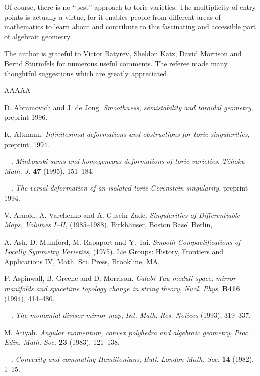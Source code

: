 \documentclass{amsart}
\theoremstyle{plain}
\theoremstyle{definition}
\begin{document}
	Of course, there is no ``best'' approach to toric varieties.
The multiplicity of entry points is actually a virtue, for it enables
people from different areas of mathematics to learn about and
contribute to this fascinating and accessible part of algebraic
geometry.

	The author is grateful to Victor Batyrev, Sheldon Katz, David
Morrison and Bernd Sturmfels for numerous useful comments.  The
referee made many thoughtful suggestions which are greatly
appreciated.

\begin{thebibliography}{AAAAA}


D. Abramovich and J. de Jong. \textit{Smoothness, semistability and toroidal geometry}, pre\-print 1996.

K. Altmann. \textit{Infinitesimal deformations and obstructions for toric singularities}, pre\-print, 1994.

---. \textit{Minkowski sums and homogeneous deformations of toric varieties}, \textit{T\^ ohoku Math. J.} \textbf{47} (1995), 151--184.

---. \textit{The versal deformation of an isolated toric Gorenstein singularity}, preprint 1994.

V. Arnold, A. Varchenko and A. Gusein-Zade. \textit{Singularities of Differentiable Maps, Volumes I--II}, (1985--1988). Birkh\"auser, Boston Basel Berlin,

A. Ash, D. Mumford, M. Rapaport and Y. Tai. \textit{Smooth Compactifications of Locally Symmetry Varieties}, (1975). Lie Groups: History, Frontiers and Applications IV, Math. Sci. Press, Brookline, MA,

P. Aspinwall, B. Greene and D. Morrison. \textit{Calabi-Yau moduli space, mirror manifolds and spacetime topology change in string theory}, \textit{Nucl. Phys.} \textbf{B416} (1994), 414--480.

---. \textit{The monomial-divisor mirror map}, \textit{Int. Math. Res. Notices} (1993), 319--337.

M. Atiyah. \textit{Angular momentum, convex polyhedra and algebraic geometry}, \textit{Proc. Edin. Math. Soc.} \textbf{23} (1983), 121--138.

---. \textit{Convexity and commuting Hamiltonians}, \textit{Bull. London Math. Soc.} \textbf{14} (1982), 1--15.


\end{thebibliography}
\end{document}
